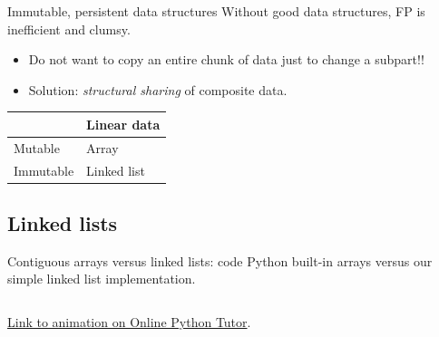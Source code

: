 \begin{frame}{Immutable, persistent data structures}
  Without good data structures, FP is inefficient and clumsy.

  \begin{itemize}
  \item Do not want to copy an entire chunk of data just to change
  a subpart!!
  \item Solution: \emph{structural sharing} of composite data.
  \end{itemize}

  \begin{table}
    \begin{tabular}{| l || l |}
      \toprule
      & Linear data \\
      \midrule
      Mutable & Array \\
      Immutable & Linked list \\
      \bottomrule
    \end{tabular}
  \end{table}
\end{frame}

\subsection{Linked lists}

\begin{frame}[fragile]{Contiguous arrays versus linked lists: code}
  Python built-in arrays versus our simple linked list implementation.

  \inputminted{python}{lists.py}

\href{http://www.pythontutor.com/visualize.html#code=mutableArray+%3D+%5B%22my%22,+%22world%22%5D%0AmutableArrayAlias+%3D+mutableArray+%23+alias+mutableArray%0A%0AmutableArray.insert(0,+%22hello%22%29%0A%0Adef+cons(head,+tail%29%3A%0A++++return+(head,+tail%29%0A++++%0AimmutableList+%3D+cons(%22my%22,+cons(%22world%22,+None%29%29%0AimmutableListAlias+%3D+immutableList%0A%0AnewImmutableList+%3D+cons(%22hello%22,+immutableList%29&mode=display&origin=opt-frontend.js&cumulative=false&heapPrimitives=false&textReferences=false&py=2&rawInputLstJSON=%5B%5D&curInstr=16}{Link to animation on Online Python Tutor}.
\end{frame}

